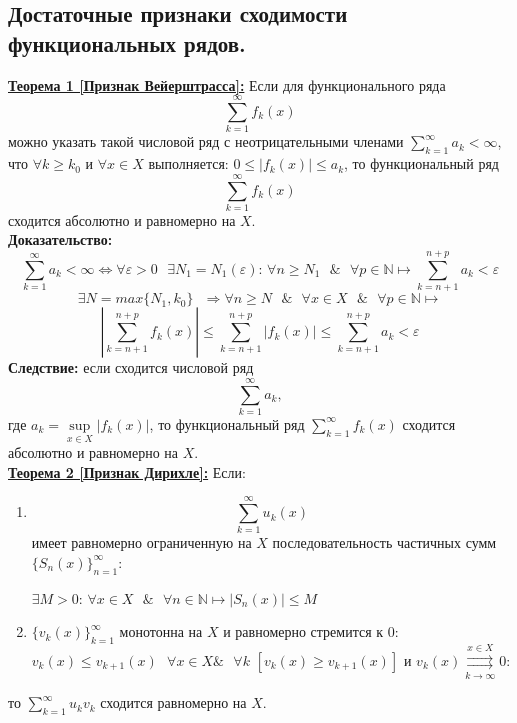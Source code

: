 \documentclass[a4paper,12pt]{article} %
\renewcommand {\geq}{\geqslant}
\renewcommand {\leq}{\leqslant}
\begin{document}
\subsection{Достаточные признаки сходимости функциональных рядов.}
\underline{\textbf{Теорема 1 [Признак Вейерштрасса]:}}
Если для функционального ряда $$\sum\limits_{k = 1}^{\infty}  f_k(x)$$ можно указать такой числовой ряд с неотрицательными членами $\sum\limits_{k = 1}^{\infty}a_k < \infty$, что $\forall k \geq k_0$ и $\forall x \in X$ выполняется: $0 \leq |f_k(x)| \leq a_k$, то функциональный ряд  $$\sum\limits_{k = 1}^{\infty}  f_k(x)$$ сходится абсолютно и равномерно на $X$.\\
\textbf{Доказательство:}
$$\sum\limits_{k = 1}^{\infty}a_k < \infty \Leftrightarrow \forall \varepsilon > 0 \text{ }\exists N_1 = N_1(\varepsilon)\text{: } \forall n \geq N_1 \text{ }\&\text{ } \forall p \in \mathds{N} \longmapsto \sum\limits_{k = n+1}^{n+p}a_k < \varepsilon$$ 
$$\exists N = max\{N_1, k_0\} \text{ } \Rightarrow \forall n \geq N \text{ } \& \text{ } \forall x \in X \text{ } \& \text{ } \forall p \in \mathds{N}\longmapsto$$ $$\left|\sum\limits_{k = n+1}^{n+p}f_k(x)\right| \leq \sum\limits_{k = n+1}^{n+p}|f_k(x)| \leq \sum\limits_{k = n+1}^{n+p}a_k < \varepsilon$$
\textbf{Следствие:} если сходится числовой ряд $$\sum\limits_{k = 1}^{\infty}a_k,$$ где $a_k = \sup\limits_{x \in X}|f_k(x)|$, то функциональный ряд $\sum\limits_{k = 1}^{\infty}  f_k(x)$ сходится абсолютно и равномерно на $X$. \\
\underline{\textbf{Теорема 2 [Признак Дирихле]:}} Если:
\begin{enumerate}
\item $$\sum\limits_{k = 1}^{\infty}  u_k(x)$$ имеет равномерно ограниченную на $X$ последовательность частичных сумм $\{S_n(x)\}_{n=1}^\infty$: 
\newline

$\exists M > 0 \text{: } \forall x \in X \text{ }\& \text{ } \forall n \in \mathbb{N} \longmapsto |S_n(x)| \leq M$

\item ${\{v_k(x)\}_{k=1}^\infty}$ монотонна на $X$ и равномерно стремится к $0$:
$v_k(x) \leq v_{k+1}(x) \text{ } \forall x \in X \text{} \& \text{ } \forall k$
$[v_k(x) \geq v_{k+1}(x)]$ и $v_k(x) \overset{x \in X}{\underset{k \rightarrow \infty}{\rightrightarrows}} 0$: 

\end{enumerate}
\hspace*{40 mm}то $\sum\limits_{k=1}^{\infty} u_k v_k$ сходится равномерно на $X$.\\
\end{document}
